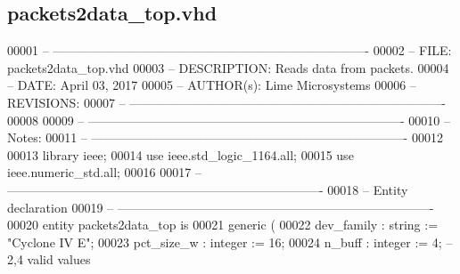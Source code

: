 \subsection{packets2data\+\_\+top.\+vhd}
\label{packets2data__top_8vhd_source}

\begin{DoxyCode}
00001 \textcolor{keyword}{-- ---------------------------------------------------------------------------- }
00002 \textcolor{keyword}{-- FILE:    packets2data\_top.vhd}
00003 \textcolor{keyword}{-- DESCRIPTION: Reads data from packets.}
00004 \textcolor{keyword}{-- DATE:    April 03, 2017}
00005 \textcolor{keyword}{-- AUTHOR(s):   Lime Microsystems}
00006 \textcolor{keyword}{-- REVISIONS:}
00007 \textcolor{keyword}{-- ---------------------------------------------------------------------------- }
00008 
00009 \textcolor{keyword}{-- ----------------------------------------------------------------------------}
00010 \textcolor{keyword}{-- Notes:}
00011 \textcolor{keyword}{-- ----------------------------------------------------------------------------}
00012 
00013 \textcolor{vhdlkeyword}{library }\textcolor{keywordflow}{ieee};
00014 \textcolor{vhdlkeyword}{use }ieee.std\_logic\_1164.\textcolor{keywordflow}{all};
00015 \textcolor{vhdlkeyword}{use }ieee.numeric\_std.\textcolor{keywordflow}{all};
00016 
00017 \textcolor{keyword}{-- ----------------------------------------------------------------------------}
00018 \textcolor{keyword}{-- Entity declaration}
00019 \textcolor{keyword}{-- ----------------------------------------------------------------------------}
00020 \textcolor{keywordflow}{entity }packets2data_top \textcolor{keywordflow}{is}
00021    \textcolor{keywordflow}{generic} \textcolor{vhdlchar}{(}
00022       \textcolor{vhdlchar}{dev_family}        \textcolor{vhdlchar}{:} \textcolor{comment}{string} \textcolor{vhdlchar}{:=} \textcolor{keyword}{"Cyclone IV E"};
00023       \textcolor{vhdlchar}{pct_size_w}        \textcolor{vhdlchar}{:} \textcolor{comment}{integer} \textcolor{vhdlchar}{:=} \textcolor{vhdllogic}{}\textcolor{vhdllogic}{16};
00024       \textcolor{vhdlchar}{n_buff}            \textcolor{vhdlchar}{:} \textcolor{comment}{integer} \textcolor{vhdlchar}{:=} \textcolor{vhdllogic}{}\textcolor{vhdllogic}{4};\textcolor{keyword}{ -- 2,4 valid values}

\end{DoxyCode}
